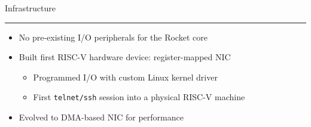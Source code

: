 \begin{block}{Infrastructure}
\hrule
\vspace{0.5\baselineskip}
\begin{itemize}
\item No pre-existing I/O peripherals for the Rocket core
\item Built first RISC-V hardware device: register-mapped NIC
	\begin{itemize}
	\footnotesize
	\item Programmed I/O with custom Linux kernel driver
	\item First \texttt{telnet/ssh} session into a physical RISC-V machine
	\end{itemize}
\item Evolved to DMA-based NIC for performance
\end{itemize}
 
\end{block}
